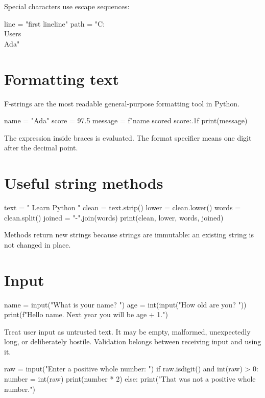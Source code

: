 \documentclass[11pt,openany,oneside]{book}
\newcommand{\inlinecode}[1]{\texttt{\small\detokenize{#1}}}
\begin{document}
Special characters use escape sequences:

\begin{code}[language=Python]
line = "first line\nsecond line"
path = "C:\\Users\\Ada"
\end{code}

\section{Formatting text}

F-strings are the most readable general-purpose formatting tool in Python.

\begin{code}[language=Python]
name = "Ada"
score = 97.5
message = f"{name} scored {score:.1f}%
print(message)
\end{code}

The expression inside braces is evaluated. The format specifier \inlinecode{:.1f} means one digit after the decimal point.

\section{Useful string methods}

\begin{code}[language=Python]
text = "  Learn Python  "
clean = text.strip()
lower = clean.lower()
words = clean.split()
joined = "-".join(words)
print(clean, lower, words, joined)
\end{code}

Methods return new strings because strings are immutable: an existing string is not changed in place.

\section{Input}

\begin{code}[language=Python]
name = input("What is your name? ")
age = int(input("How old are you? "))
print(f"Hello {name}. Next year you will be {age + 1}.")
\end{code}

Treat user input as untrusted text. It may be empty, malformed, unexpectedly long, or deliberately hostile. Validation belongs between receiving input and using it.

\begin{code}[language=Python]
raw = input("Enter a positive whole number: ")
if raw.isdigit() and int(raw) > 0:
    number = int(raw)
    print(number * 2)
else:
    print("That was not a positive whole number.")
\end{code}
\end{document}
